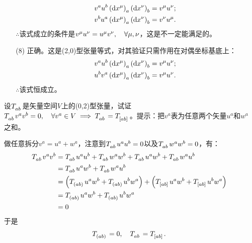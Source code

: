 \begin{xiti}
\begin{jie}
\begin{enumerate}
    		\begin{align*}
    		\tensor{v}{^a} \tensor{u}{^b} \tensor{\left(\dd{x^\mu}\right)}{_a} \tensor{\left(\dd{x^\nu}\right)}{_b}&=\tensor{v}{^\mu} \tensor{u}{^\nu};\\
    		\tensor{v}{^b} \tensor{u}{^a} \tensor{\left(\dd{x^\mu}\right)}{_a} \tensor{\left(\dd{x^\nu}\right)}{_b}&=\tensor{v}{^\nu} \tensor{u}{^\mu}.
    		\end{align*}
    		$\therefore$该式成立的条件是$v^\mu u^\nu=u^\mu v^\nu\qc \forall \mu,\nu $，这是不一定能满足的。
    		\item[(8)] 正确。这是(2,0)型张量等式，对其验证只需作用在对偶坐标基底上：
    		\begin{align*}
    		v^a u^b \tensor{\left(\dd{x^\mu}\right)}{_a} \tensor{\left(\dd{x^\nu}\right)}{_b}&=v^\mu u^\nu;\\
    		u^b v^a \tensor{\left(\dd{x^\mu}\right)}{_a} \tensor{\left(\dd{x^\nu}\right)}{_b}&=v^\mu u^\nu.
    		\end{align*}
    		$\therefore$该式恒成立。
    	\end{enumerate}
    \end{jie}
    
    \item 设$\tensor{T}{_a_b}$是矢量空间$V$上的(0,2)型张量，试证$\tensor{T}{_a_b}v^a v^b=0\qc \forall v^a \in V\implies \tensor{T}{_a_b}=\tensor{T}{_{[ab]}} $。提示：把$v^a$表为任意两个矢量$u^a $和$w^a$之和。
    
    \begin{zm}
    	做任意拆分$v^a=u^a+w^a$，注意到$\tensor{T}{_a_b}u^a u^b=0 $以及$\tensor{T}{_a_b}w^a w^b=0$，有：
    	\begin{align*}
    	\tensor{T}{_a_b}v^a v^b&=\tensor{T}{_a_b}u^a u^b+\tensor{T}{_a_b} w^a w^b+\tensor{T}{_a_b} u^a w^b +\tensor{T}{_a_b}w^a u^b\\
    	&=\tensor{T}{_a_b} u^a w^b +\tensor{T}{_a_b}w^a u^b\\
    	&=\left(\tensor{T}{_{\left(ab\right)}}u^a w^b+\tensor{T}{_{\left(ab\right)}}u^b w^a\right)+\left(\tensor{T}{_{\left[ab\right]}}u^a w^b+\tensor{T}{_{\left[ab\right]}}u^b w^a \right)\\
    	&=\tensor{T}{_{\left(ab\right)}}u^a w^b+\tensor{T}{_{\left(ab\right)}}u^b w^a\\
    	&=0
    	\end{align*}
    	于是
    	\begin{displaymath}
    	\tensor{T}{_{\left(ab\right)}}=0\qc \tensor{T}{_a_b}=\tensor{T}{_{\left[ab\right]}}.
    	\end{displaymath}
    \end{zm}
    

\end{xiti}
